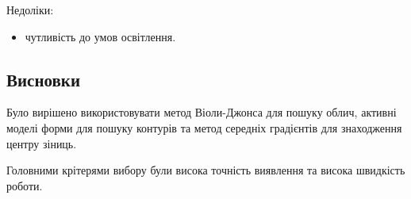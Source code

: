Недоліки:
\begin{itemize}
	\item чутливість до умов освітлення. 
\end{itemize}

\subsection{Висновки}
Було вирішено використовувати метод Віоли-Джонса для пошуку облич, активні моделі форми для пошуку контурів та метод середніх градієнтів для знаходження центру зіниць.

Головними крітерями вибору були висока точність виявлення та висока швидкість роботи.
